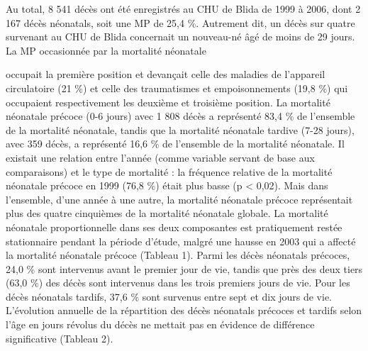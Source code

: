 \documentclass[
]{book}
\begin{document}
Au total, 8 541 décès ont été enregistrés au CHU de Blida
de 1999 à 2006, dont 2 167 décès néonatals, soit une MP de
25,4 \%. Autrement dit, un décès sur quatre survenant au
CHU de Blida concernait un nouveau-né âgé de moins
de 29 jours. La MP occasionnée par la mortalité néonatale

occupait la première position et devançait celle des maladies
de l'appareil circulatoire (21 \%) et celle des traumatismes et
empoisonnements (19,8 \%) qui occupaient respectivement
les deuxième et troisième position.
La mortalité néonatale précoce (0-6 jours) avec 1 808
décès a représenté 83,4 \% de l'ensemble de la mortalité
néonatale, tandis que la mortalité néonatale tardive
(7-28 jours), avec 359 décès, a représenté 16,6 \% de
l'ensemble de la mortalité néonatale. Il existait une relation
entre l'année (comme variable servant de base aux
comparaisons) et le type de mortalité : la fréquence relative
de la mortalité néonatale précoce en 1999 (76,8 \%) était plus
basse (p \textless{} 0,02). Mais dans l'ensemble, d'une année à une
autre, la mortalité néonatale précoce représentait plus des
quatre cinquièmes de la mortalité néonatale globale.
La mortalité néonatale proportionnelle dans ses deux
composantes est pratiquement restée stationnaire pendant la
période d'étude, malgré une hausse en 2003 qui a affecté la
mortalité néonatale précoce (Tableau 1).
Parmi les décès néonatals précoces, 24,0 \% sont intervenus
avant le premier jour de vie, tandis que près des deux
tiers (63,0 \%) des décès sont intervenus dans les trois
premiers jours de vie. Pour les décès néonatals tardifs,
37,6 \% sont survenus entre sept et dix jours de vie.
L'évolution annuelle de la répartition des décès néonatals
précoces et tardifs selon l'âge en jours révolus du décès
ne mettait pas en évidence de différence significative
(Tableau 2).
\end{document}
